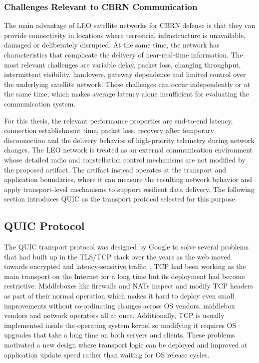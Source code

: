 \subsubsection{Challenges Relevant to CBRN Communication}
The main advantage of LEO satellite networks for CBRN defense is that they can provide connectivity in locations where terrestrial infrastructure is unavailable, damaged or deliberately disrupted. At the same time, the network has characteristics that complicate the delivery of near-real-time information. The most relevant challenges are variable delay, packet loss, changing throughput, intermittent visibility, handovers, gateway dependence and limited control over the underlying satellite network. These challenges can occur independently or at the same time, which makes average latency alone insufficient for evaluating the communication system.
\par
For this thesis, the relevant performance properties are end-to-end latency, connection establishment time, packet loss, recovery after temporary disconnection and the delivery behavior of high-priority telemetry during network changes. The LEO network is treated as an external communication environment whose detailed radio and constellation control mechanisms are not modified by the proposed artifact. The artifact instead operates at the transport and application boundaries, where it can measure the resulting network behavior and apply transport-level mechanisms to support resilient data delivery. The following section introduces QUIC as the transport protocol selected for this purpose.
\subsection{QUIC Protocol}
The QUIC transport protocol was designed by Google to solve several problems that had built up in the TLS/TCP stack over the years as the web moved towards encrypted and latency-sensitive traffic~\citep{LangleyAdam2017TQTP}. TCP had been working as the main transport on the Internet for a long time but its deployment had become restrictive. Middleboxes like firewalls and NATs inspect and modify TCP headers as part of their normal operation which makes it hard to deploy even small improvements without co-ordinating changes across OS vendors, middlebox vendors and network operators all at once. Additionally, TCP is usually implemented inside the operating system kernel so modifying it requires OS upgrades that take a long time on both servers and clients. These problems motivated a new design where transport logic can be deployed and improved at application update speed rather than waiting for OS release cycles.
